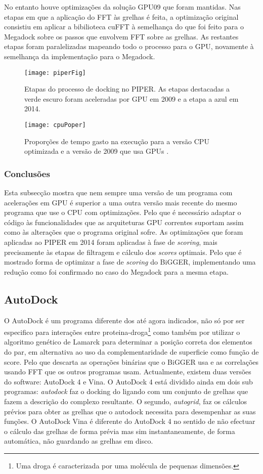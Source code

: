  No entanto houve optimizações da solução GPU09 que foram mantidas. Nas etapas em que a aplicação do FFT às grelhas é feita, a optimização original consistiu em aplicar a bibilioteca cuFFT à semelhança do que foi feito para o Megadock sobre os passos que envolvem FFT sobre as grelhas. As restantes etapas foram paralelizadas mapeando todo o processo para o GPU, novamente à semelhança da implementação para o Megadock.
    \begin{figure}[ht]
  \centering
    {\texttt{[image: piperFig]}}
  \caption{Etapas do processo de docking no PIPER. As etapas destacadas a verde escuro foram aceleradas por GPU em 2009 e a etapa a azul em 2014. \cite{piper2014gpu} }
  \label{piperGPU}
\end{figure}

    \begin{figure}[ht]
  \centering
    {\texttt{[image: cpuPoper]}}
  \caption{Proporções de tempo gasto na execução para a versão CPU optimizada e a versão de 2009 que usa GPUs\cite{piper2014gpu} . }
  \label{propPiper}
\end{figure}
\subsubsection{Conclusões}
Esta subsecção mostra que nem sempre uma versão de um programa com acelerações em GPU é superior a uma outra versão mais recente do mesmo programa que use o CPU com optimizações. Pelo que é necessário adaptar o código às funcionalidades que as arquiteturas GPU correntes suportam assim como às alterações que o programa original sofre. As optimizações que foram aplicadas ao PIPER em 2014 foram aplicadas à fase de \textit{scoring}, mais precisamente às etapas de filtragem e cálculo dos \textit{scores} optimais. Pelo que é mostrado forma de optimizar a fase de \textit{scoring} do BiGGER, implementando uma redução como foi confirmado no caso do Megadock para a mesma etapa.
\subsection {AutoDock}
O AutoDock \cite{autoDock} é um programa diferente dos até agora indicados, não só por ser especifico para interações entre proteina-droga\footnote[9]{Uma droga é caracterizada  por uma molécula de pequenas dimensões.} como também por utilizar o algoritmo genético de Lamarck para determinar a posição correta dos elementos do par, em alternativa ao uso da complementaridade de superficie como função de score. Pelo que descarta as operações binárias que o BiGGER usa e as correlações usando FFT que os outros programas usam.
Actualmente, existem duas versões do software: AutoDock 4 e Vina\cite{autoDockVina}. O AutoDock 4 está dividido ainda em dois sub programas: \textit{autodock} faz o docking do ligando com um conjunto de grelhas que fazem a descrição do complexo resultante. O segundo, \textit{autogrid}, faz os cálculos prévios para obter as grelhas que o autodock necessita para desempenhar as suas funções.  
O AutoDock Vina é diferente do AutoDock 4 no sentido de não efectuar o cálculo das grelhas de forma prévia mas sim instantaneamente, de forma automática, não guardando as grelhas em disco.
